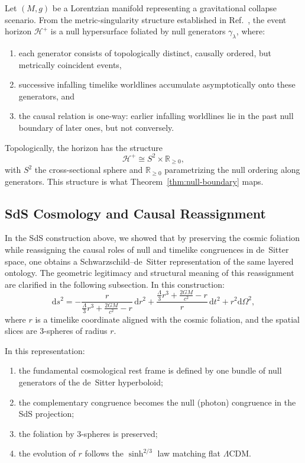 \documentclass[11pt,a4paper]{article}
\theoremstyle{plain}
\theoremstyle{definition}
\theoremstyle{remark}
\begin{document}
Let $(M,g)$ be a Lorentzian manifold representing a gravitational collapse scenario. From the metric-singularity structure established in Ref.~\cite{JanzenBHcausality}, the event horizon $\mathcal{H}^+$ is a null hypersurface foliated by null generators $\gamma_\lambda$, where:
\begin{enumerate}
    \item each generator consists of topologically distinct, causally ordered, but metrically coincident events,
    \item successive infalling timelike worldlines accumulate asymptotically onto these generators, and
    \item the causal relation is one-way: earlier infalling worldlines lie in the past null boundary of later ones, but not conversely.
\end{enumerate}

Topologically, the horizon has the structure
\[
\mathcal{H}^+ \cong S^2 \times \mathbb{R}_{\ge 0},
\]
with $S^2$ the cross-sectional sphere and $\mathbb{R}_{\ge 0}$ parametrizing the null ordering along generators. This structure is what Theorem~\ref{thm:null-boundary} maps.

\subsection{SdS Cosmology and Causal Reassignment}

In the SdS construction above, we showed that by preserving the cosmic foliation while reassigning the causal roles of null and timelike congruences in de~Sitter space, one obtains a Schwarzschild--de~Sitter representation of the same layered ontology. The geometric legitimacy and structural meaning of this reassignment are clarified in the following subsection. In this construction:
\begin{equation}
    \mathrm{d}s^2
    = -\frac{r}{\frac{\Lambda}{3}r^3 + \frac{2GM}{c^2} - r}\,\mathrm{d}r^2
    + \frac{\frac{\Lambda}{3}r^3 + \frac{2GM}{c^2} - r}{r}\,\mathrm{d}t^2
    + r^2 \mathrm{d}\Omega^2,
\end{equation}
where $r$ is a timelike coordinate aligned with the cosmic foliation, and the spatial slices are 3-spheres of radius $r$.

In this representation:
\begin{enumerate}
    \item the fundamental cosmological rest frame is defined by one bundle of null generators of the de~Sitter hyperboloid;
    \item the complementary congruence becomes the null (photon) congruence in the SdS projection;
    \item the foliation by 3-spheres is preserved;
    \item the evolution of $r$ follows the $\sinh^{2/3}$ law matching flat $\Lambda$CDM.
\end{enumerate}
\end{document}
